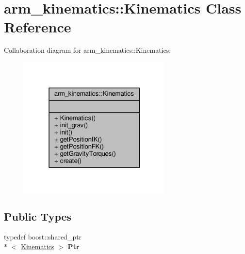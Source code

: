 \hypertarget{classarm__kinematics_1_1_kinematics}{\section{arm\-\_\-kinematics\-:\-:Kinematics Class Reference}
\label{classarm__kinematics_1_1_kinematics}
}


Collaboration diagram for arm\-\_\-kinematics\-:\-:Kinematics\-:\nopagebreak
\begin{figure}[H]
\begin{center}
\leavevmode
\includegraphics[width=220pt]{classarm__kinematics_1_1_kinematics__coll__graph}
\end{center}
\end{figure}
\subsection*{Public Types}
\begin{DoxyCompactItemize}
\item 
\hypertarget{classarm__kinematics_1_1_kinematics_acccc63bf9ad564b432798a92b7f4f1bd}{typedef boost\-::shared\-\_\-ptr\\*
$<$ \hyperlink{classarm__kinematics_1_1_kinematics}{Kinematics} $>$ {\bfseries Ptr}}\label{classarm__kinematics_1_1_kinematics_acccc63bf9ad564b432798a92b7f4f1bd}

\end{DoxyCompactItemize}
